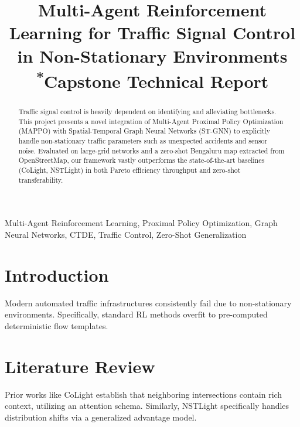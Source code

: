 \documentclass[conference]{IEEEtran}
\begin{document}
\title{Multi-Agent Reinforcement Learning for Traffic Signal Control in Non-Stationary Environments\\
{\footnotesize \textsuperscript{*}Capstone Technical Report}
}

\author{
}

\maketitle

\begin{abstract}
Traffic signal control is heavily dependent on identifying and alleviating bottlenecks. This project presents a novel integration of Multi-Agent Proximal Policy Optimization (MAPPO) with Spatial-Temporal Graph Neural Networks (ST-GNN) to explicitly handle non-stationary traffic parameters such as unexpected accidents and sensor noise. Evaluated on large-grid networks and a zero-shot Bengaluru map extracted from OpenStreetMap, our framework vastly outperforms the state-of-the-art baselines (CoLight, NSTLight) in both Pareto efficiency throughput and zero-shot transferability. 
\end{abstract}

\begin{IEEEkeywords}
Multi-Agent Reinforcement Learning, Proximal Policy Optimization, Graph Neural Networks, CTDE, Traffic Control, Zero-Shot Generalization
\end{IEEEkeywords}

\section{Introduction}
Modern automated traffic infrastructures consistently fail due to non-stationary environments. Specifically, standard RL methods overfit to pre-computed deterministic flow templates. 

\section{Literature Review}
Prior works like CoLight\cite{colight2020} establish that neighboring intersections contain rich context, utilizing an attention schema. Similarly, NSTLight\cite{nstlight2022} specifically handles distribution shifts via a generalized advantage model.
\end{document}
